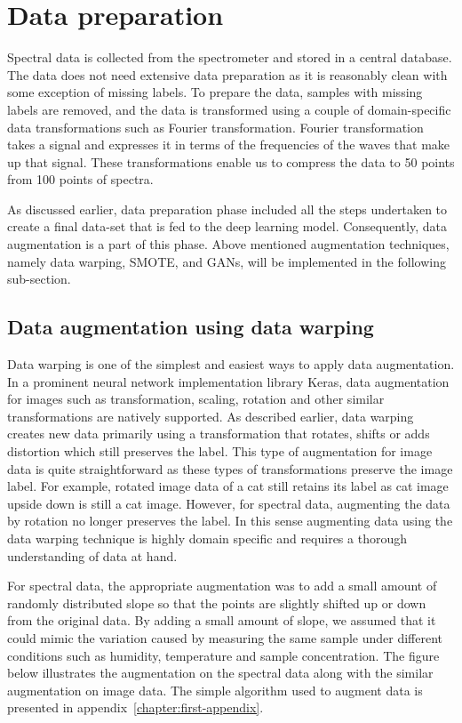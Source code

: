 \section{Data preparation}

 Spectral data is collected from the spectrometer and stored in a central database. The data does not need extensive data preparation as it is reasonably clean with some exception of missing labels. To prepare the data, samples with missing labels are removed, and the data is transformed using a couple of domain-specific data transformations such as Fourier transformation. Fourier transformation takes a signal and expresses it in terms of the frequencies of the waves that make up that signal. These transformations enable us to compress the data to 50 points from 100 points of spectra.

As discussed earlier, data preparation phase included all the steps undertaken to create a final data-set that is fed to the deep learning model. Consequently, data augmentation is a part of this phase. Above mentioned augmentation techniques, namely data warping, SMOTE, and GANs, will be implemented in the following sub-section.

\subsection{Data augmentation using data warping}
Data warping is one of the simplest and easiest ways to apply data augmentation. In a prominent neural network implementation library Keras, data augmentation for images such as transformation, scaling, rotation and other similar transformations are natively supported. As described earlier, data warping creates new data primarily using a transformation that rotates, shifts or adds distortion which still preserves the label. This type of augmentation for image data is quite straightforward as these types of transformations preserve the image label. For example, rotated image data of a cat still retains its label as cat image upside down is still a cat image. However, for spectral data, augmenting the data by rotation no longer preserves the label. In this sense augmenting data using the data warping technique is highly domain specific and requires a thorough understanding of data at hand.

For spectral data, the appropriate augmentation was to add a small amount of randomly distributed slope so that the points are slightly shifted up or down from the original data. By adding a small amount of slope, we assumed that it could mimic the variation caused by measuring the same sample under different conditions such as humidity, temperature and sample concentration. The figure below illustrates the augmentation on the spectral data along with the similar augmentation on image data. The simple algorithm used to augment data is presented in appendix~\ref{chapter:first-appendix}.

